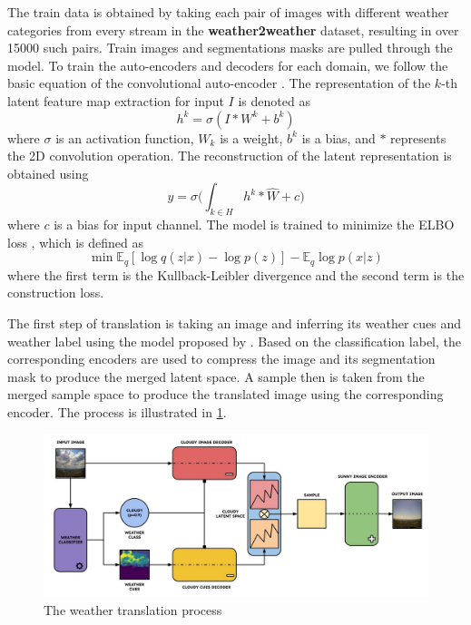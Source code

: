 \documentclass[11pt]{article}
\begin{document}
    The train data is obtained by taking each pair of images with different weather categories
    from every stream in the \textbf{weather2weather} dataset, resulting in over 15000 such pairs.
    Train images and segmentations masks are pulled through the model. To train the auto-encoders
    and decoders for each domain, we follow the basic equation of the convolutional
    auto-encoder \cite{https://doi.org/10.48550/arxiv.1312.6114}. The representation
    of the $k$-th latent feature map extraction for input $I$ is denoted as
    \begin{equation}
        h^k = \sigma(I * W^k + b^k)
    \end{equation}
    where $\sigma$ is an activation function, $W_k$ is a weight, $b^k$ is a bias,
    and $*$ represents the 2D convolution operation. The reconstruction of the latent
    representation is obtained using 
    \begin{equation}
        y = \sigma\bigg(\int_{k \in H} h^k * \widehat{W} + c\bigg)
    \end{equation}
    where $c$ is a bias for input channel. The model is trained to minimize the ELBO loss
    \cite{https://doi.org/10.48550/arxiv.1312.6114}, which is defined as
    \begin{equation}
        \min \mathbb{E}_q[\log q(z | x) - \log p(z)] - \mathbb{E}_q \log p(x | z)
    \end{equation}
    where the first term is the Kullback-Leibler divergence and the second term is 
    the construction loss.

    The first step of translation is taking an image and inferring its weather cues
    and weather label using the model proposed by \cite{ZHAO2019272}. Based on the
    classification label, the corresponding encoders are used to compress the image
    and its segmentation mask to produce the merged latent space. A sample then is taken
    from the merged sample space to produce the translated image using the corresponding
    encoder. The process is illustrated in \ref{fig:model}.

    \begin{figure}[!htb]
        \includegraphics[width=\linewidth]{images/model_architecture.jpg}
        \caption{The weather translation process}
        \label{fig:model}
    \end{figure}
\end{document}
